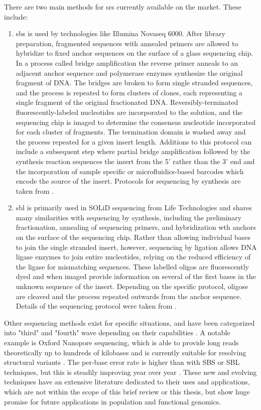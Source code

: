 There are two main methods for \gls{srs} currently available on the market. These include: 

\begin{enumerate}
    \item \Gls{sbs} is used by technologies like Illumina Novaseq 6000. After library preparation, fragmented sequences with annealed primers are allowed to hybridize to fixed anchor sequences on the surface of a glass sequencing chip. In a process called bridge amplification the reverse primer anneals to an adjacent anchor sequence and polymerase enzymes synthesize the original fragment of DNA. The bridges are broken to form single stranded sequences, and the process is repeated to form clusters of clones, each representing a single fragment of the original fractionated DNA. Reversibly-terminated fluorescently-labeled nucleotides are incorporated to the solution, and the sequencing chip is imaged to determine the consensus nucleotide incorporated for each cluster of fragments. The termination domain is washed away and the process repeated for a given insert length. Additions to this protocol can include a subsequent step where partial bridge amplification followed by the synthesis reaction sequences the insert from the 5' rather than the 3' end and the incorporation of sample specific or microfluidics-based barcodes which encode the source of the insert. Protocols for sequencing by synthesis are taken from \textcite{Illumina}.
    \item \Gls{sbl} is primarily used in SOLiD sequencing from Life Technologies and shares many similarities with sequencing by synthesis, including the preliminary fractionation, annealing of sequencing primers, and hybridization wth anchors on the surface of the sequencing chip. Rather than allowing individual bases to join the single stranded insert, however, sequencing by ligation allows DNA ligase enzymes to join entire nucleotides, relying on the reduced efficiency of the ligase for mismatching sequences. These labelled oligos are fluorescently dyed and when imaged provide information on several of the first bases in the unknown sequence of the insert. Depending on the specific protocol, oligose are cleaved and the process repeated outwards from the anchor sequence. Details of the sequencing protocol were taken from \textcite{Slatko2018}.
\end{enumerate}

Other sequencing methods exist for specific situations, and have been categorized into "third" and "fourth" wave depending on their capabilities \cite{Slatko2018}. A notable example is Oxford Nanopore sequencing, which is able to provide long reads theoretically up to hundreds of kilobases and is currently suitable for resolving structural variants \cite{AByrne2019,Bayega2018}. The per-base error rate is higher than with SBS or SBL techniques, but this is steadily improving year over year \cite{Sahlin2021}. These new and evolving techniques have an extensive literature dedicated to their uses and applications, which are not within the scope of this brief review or this thesis, but show huge promise for future applications in population and functional genomics. 

